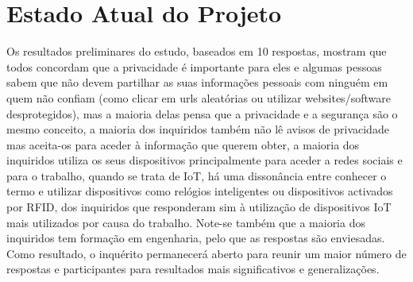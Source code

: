 \documentclass[conference]{IEEEtran}
\begin{document}
\section{Estado Atual do Projeto}

Os resultados preliminares do estudo, baseados em 10 respostas, mostram que
todos concordam que a privacidade é importante para eles e algumas pessoas
sabem que não devem partilhar as suas informações pessoais com ninguém em
quem não confiam (como clicar em urls aleatórias ou utilizar websites/software
desprotegidos), mas a maioria delas pensa que a privacidade e a segurança
são o mesmo conceito, a maioria dos inquiridos também não lê avisos de privacidade
mas aceita-os para aceder à informação que querem obter, a maioria dos inquiridos
utiliza os seus dispositivos principalmente para aceder a redes sociais e para
o trabalho, quando se trata de IoT, há uma dissonância entre conhecer o termo
e utilizar dispositivos como relógios inteligentes ou dispositivos activados
por RFID, dos inquiridos que responderam sim à utilização de dispositivos
IoT mais utilizados por causa do trabalho. Note-se também que a maioria dos
inquiridos tem formação em engenharia, pelo que as respostas são enviesadas.
Como resultado, o inquérito permanecerá aberto para reunir um maior número
de respostas e participantes para resultados mais significativos e generalizações.

\end{document}

